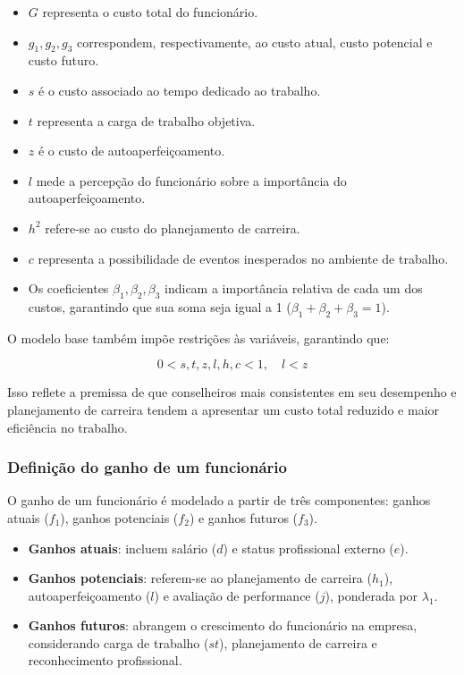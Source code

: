 \documentclass[
	article,			%
	11pt,				%
	oneside,			%
	a4paper,			%
	english,			%
	brazil,				%
	sumario=tradicional
	]{abntex2}
\begin{document}
\begin{itemize}
    \item \( G \) representa o custo total do funcionário.
    \item \( g_1, g_2, g_3 \) correspondem, respectivamente, ao custo atual, custo potencial e custo futuro.
    \item \( s \) é o custo associado ao tempo dedicado ao trabalho.
    \item \( t \) representa a carga de trabalho objetiva.
    \item \( z \) é o custo de autoaperfeiçoamento.
    \item \( l \) mede a percepção do funcionário sobre a importância do autoaperfeiçoamento.
    \item \( h^2 \) refere-se ao custo do planejamento de carreira.
    \item \( c \) representa a possibilidade de eventos inesperados no ambiente de trabalho.
    \item Os coeficientes \( \beta_1, \beta_2, \beta_3 \) indicam a importância relativa de cada um dos custos, garantindo que sua soma seja igual a 1 (\( \beta_1 + \beta_2 + \beta_3 = 1 \)).
\end{itemize}

O modelo base também impõe restrições às variáveis, garantindo que:

\[
0 < s, t, z, l, h, c < 1, \quad l < z
\]

Isso reflete a premissa de que conselheiros mais consistentes em seu desempenho e planejamento de carreira tendem a apresentar um custo total reduzido e maior eficiência no trabalho.

\subsubsection{Definição do ganho de um funcionário}
O ganho de um funcionário é modelado a partir de três componentes: ganhos atuais (\( f_1 \)), ganhos potenciais (\( f_2 \)) e ganhos futuros (\( f_3 \)).

\begin{itemize}
    \item \textbf{Ganhos atuais}: incluem salário (\( d \)) e status profissional externo (\( e \)).
    \item \textbf{Ganhos potenciais}: referem-se ao planejamento de carreira (\( h_1 \)), autoaperfeiçoamento (\( l \)) e avaliação de performance (\( j \)), ponderada por \( \lambda_1 \).
    \item \textbf{Ganhos futuros}: abrangem o crescimento do funcionário na empresa, considerando carga de trabalho (\( st \)), planejamento de carreira e reconhecimento profissional.
\end{itemize}
\end{document}
